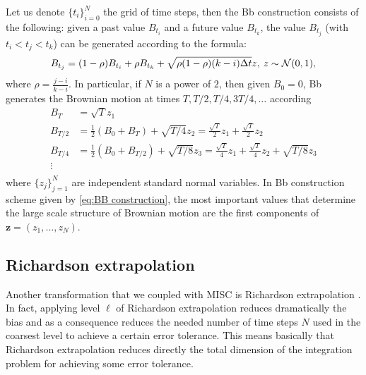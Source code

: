 Let us denote $\{t_i\}_{i=0}^{N}$ the grid of time steps, then the Bb construction \cite{glasserman2004monte} consists of the following: given a past value $B_{t_i}$ and a future value $B_{t_k}$, the value $B_{t_j}$ (with $t_i < t_j < t_k$) can be generated according to the formula:
\begin{equation}
B_{t_j}=(1-\rho) B_{t_i}+\rho B_{t_k}+ \sqrt{\rho (1-\rho)(k-i) \Delta t} z, \: z \sim \mathcal{N}(0,1) ,
\end{equation}
where $\rho=\frac{j-i}{k-i}$.  In particular, if $N$ is a power of $2$, then given $B_0=0$, Bb generates the Brownian motion at times $T, T/2,T/4,3T/4,\dots$ according
\begin{align}\label{eq:BB construction}
	B_T&=\sqrt{T}z_1\nonumber\\
	B_{T/2}&= \frac{1}{2}(B_{0}+B_{T})+\sqrt{T/4}z_2= \frac{\sqrt{T}}{2} z_1+\frac{\sqrt{T}}{2} z_2\nonumber\\
	B_{T/4}&=\frac{1}{2} (B_{0}+B_{T/2})+\sqrt{T/8}z_3= \frac{\sqrt{T}}{4} z_1+\frac{\sqrt{T}}{4} z_2+\sqrt{T/8}z_3\nonumber\\
	\vdots \nonumber\\
\end{align}
where $\{z_j\}_{j=1}^{N}$ are independent standard normal variables.  In Bb construction scheme given by \eqref{eq:BB construction}, the most important values that determine the large scale structure of Brownian motion are the first components of $\mathbf{z} = (z_1,\dots,z_N)$.



%


\subsection{Richardson extrapolation}\label{sec:Richardson extrapolation}


Another transformation that we coupled with MISC is Richardson extrapolation \cite{talay1990expansion}. In fact, applying level $\ell$ of Richardson extrapolation reduces dramatically the bias and as a consequence reduces the needed number of time steps $N$ used in the coarsest level to achieve a certain error tolerance. This means basically that Richardson extrapolation reduces directly the total dimension of the integration problem for achieving some error tolerance.


